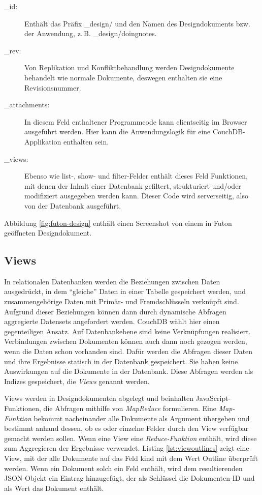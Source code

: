 \begin{description}
  \item[\_id:] Enthält das Präfix {\selectfont \_design/} und den Namen des Designdokuments bzw. der Anwendung, z.\,B. {\selectfont \_design/doingnotes}.
  \item[\_rev:] Von Replikation und Konfliktbehandlung werden Designdokumente behandelt wie normale Dokumente, deswegen enthalten sie eine Revisionsnummer.
  \item[\_attachments:] In diesem Feld enthaltener Programmcode kann clientseitig im Browser ausgeführt werden. Hier kann die Anwendungslogik für eine CouchDB-Applikation enthalten sein. 
  \item[\_views:] Ebenso wie {\selectfont list}-, {\selectfont show}- und {\selectfont filter}-Felder enthält dieses Feld Funktionen, mit denen der Inhalt einer Datenbank gefiltert, strukturiert und/oder modifiziert ausgegeben werden kann. Dieser Code wird serverseitig, also von der Datenbank ausgeführt.
\end{description}

Abbildung \ref{fig:futon-design} enthält einen Screenshot von einem in Futon geöffneten Designdokument.




\subsection{Views}
\label{subsec:views}

In relationalen Datenbanken werden die Beziehungen zwischen Daten ausgedrückt, in dem \enquote{gleiche} Daten in einer Tabelle gespeichert werden, und zusammengehörige Daten mit Primär- und Fremdschlüsseln verknüpft sind. Aufgrund dieser Beziehungen können dann durch dynamische Abfragen aggregierte Datensets angefordert werden. CouchDB wählt hier einen gegenteiligen Ansatz. Auf Datenbankebene sind keine Verknüpfungen realisiert. Verbindungen zwischen Dokumenten können auch dann noch gezogen werden, wenn die Daten schon vorhanden sind. Dafür werden die Abfragen dieser Daten und ihre Ergebnisse statisch in der Datenbank gespeichert. Sie haben keine Auswirkungen auf die Dokumente in der Datenbank. Diese Abfragen werden als Indizes gespeichert, die \textit{Views} genannt werden. 

Views werden in Designdokumenten abgelegt und beinhalten JavaScript-Funktionen, die Abfragen mithilfe von \textit{MapReduce}  formulieren. Eine \textit{Map-Funktion} bekommt nacheinander alle Dokumente als Argument übergeben und bestimmt anhand dessen, ob es oder einzelne Felder durch den View verfügbar gemacht werden sollen. Wenn eine View eine \textit{Reduce-Funktion} enthält, wird diese zum Aggregieren der Ergebnisse verwendet. Listing \ref{lst:viewoutlines} zeigt eine View, mit der alle Dokumente auf das Feld {\selectfont kind} mit dem Wert {\selectfont Outline} überprüft werden. Wenn ein Dokument solch ein Feld enthält, wird dem resultierenden JSON-Objekt ein Eintrag hinzugefügt, der als Schlüssel die Dokumenten-ID und als Wert das Dokument enthält.

